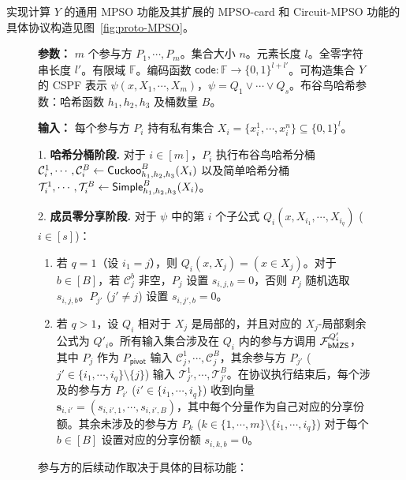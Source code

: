 实现计算 $Y$ 的通用 MPSO 功能及其扩展的 MPSO-card 和 Circuit-MPSO 功能的具体协议构造见图~\ref{fig:proto-MPSO}。

\begin{figure}[!hbtp]
\begin{framed}
\begin{minipage}[c]{\textwidth}
\begin{trivlist}
\item \textbf{参数：} $m$ 个参与方 $P_1, \cdots, P_m$。集合大小 $n$。元素长度 $l$。全零字符串长度 $l'$。有限域 $\mathbb{F}$。编码函数 $\mathsf{code}:\mathbb{F} \to \{0,1\}^{l+l'}$。可构造集合 $Y$ 的 CSPF 表示 $\psi(x,X_1,\cdots,X_m)$，$\psi = Q_1 \lor \cdots \lor Q_s$。布谷鸟哈希参数：哈希函数 $h_1, h_2, h_3$ 及桶数量 $B$。

\item \textbf{输入：} 每个参与方 $P_i$ 持有私有集合 $X_i = \{x_i^1,\cdots, x_i^n\} \subseteq \{0,1\}^l$。

1. \textbf{哈希分桶阶段.} 对于 $i \in [m] $，$P_i$ 执行布谷鸟哈希分桶 $\mathcal{C}_i^1, \cdots, \mathcal{C}_i^B \gets \mathsf{Cuckoo}_{h_1,h_2,h_3}^B(X_i)$ 以及简单哈希分桶 $\mathcal{T}_i^1, \cdots, \mathcal{T}_i^B \gets \mathsf{Simple}_{h_1,h_2,h_3}^B(X_i)$。

2. \textbf{成员零分享阶段.} 对于 $\psi$ 中的第 $i$ 个子公式 $Q_i(x,X_{i_1},\cdots,X_{i_q})$ ($i \in [s]$)：
\begin{enumerate}[itemsep=2pt,topsep=0pt,parsep=0pt,leftmargin=10pt,label=(\alph*)]
    \item 若 $q = 1$（设 $i_1 = j$），则 $Q_i(x,X_j) = (x \in X_j)$。对于 $b \in [B]$，若 $\mathcal{C}_j^b$ 非空，$P_j$ 设置 $s_{i,j,b} = 0$，否则 $P_j$ 随机选取 $s_{i,j,b}$。$P_{j'}$ ($j' \neq j$) 设置 $s_{i,j',b} = 0$。
    \item 若 $q > 1$，设 $Q_i$ 相对于 $X_j$ 是局部的，并且对应的 $X_j$-局部剩余公式为 $Q'_i$。所有输入集合涉及在 $Q_i$ 内的参与方调用 $\mathcal{F}_\mathsf{bMZS}^{Q'_i}$，其中 $P_j$ 作为 $P_{\mathsf{pivot}}$ 输入 $\mathcal{C}_j^1, \cdots, \mathcal{C}_j^B$，其余参与方 $P_{j'}$ ($j' \in \{{i_1},\cdots,{i_q}\} \setminus \{j\}$) 输入 $\mathcal{T}_{j'}^1, \cdots, \mathcal{T}_{j'}^B$。在协议执行结束后，每个涉及的参与方 $P_{i'}$ ($i' \in \{{i_1},\cdots,{i_q}\}$) 收到向量 $\textbf{s}_{i,i'}=(s_{i,i',1},\cdots,s_{i,i',B})$，其中每个分量作为自己对应的分享份额。其余未涉及的参与方 $P_k$ ($k \in \{1,\cdots,m\} \setminus \{{i_1},\cdots,{i_q}\}$) 对于每个 $b \in [B]$ 设置对应的分享份额 $s_{i,k,b} = 0$。
\end{enumerate}

参与方的后续动作取决于具体的目标功能：


\end{trivlist}
\end{minipage}
\end{framed}
\end{figure}
